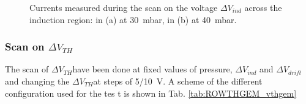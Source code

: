 \documentclass[a4paper, 11 pt]{report}
\newcommand{\Vind}{$\Delta V_{ind}$}
\newcommand{\Vthgem}{$\Delta V_{TH}$}
\newcommand{\Vdrift}{$ \Delta V_{drift}$}
\begin{document}
\begin{figure}[!htb]
	\centering
	\caption{Currents measured during the scan on the voltage \Vind{} across the induction region: in (a) at 30~mbar, in (b) at 40~mbar.}
	\label{fig:induction_ROWTHGEM_other_pressures}
\end{figure}
\clearpage

\subsubsection{Scan on \Vthgem}
The scan of \Vthgem have been done at fixed values of pressure, \Vind{} and \Vdrift{} and 
changing the \Vthgem at steps of 5/10~V.
A scheme of the different configuration used for the tes t is shown in Tab. \ref{tab:ROWTHGEM_vthgem}
\end{document}
